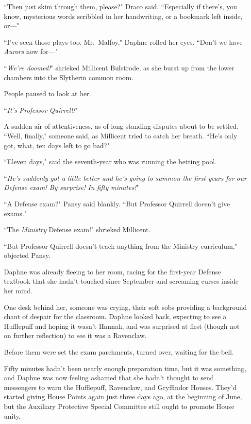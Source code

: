 ``Then just skim through them, please?" Draco said. ``Especially if there's, you know, mysterious words scribbled in her handwriting, or a bookmark left inside, or---"

``I've seen those plays too, Mr.~Malfoy." Daphne rolled her eyes. ``Don't we have \emph{Aurors} now for---"

``\emph{We're doomed!}" shrieked Millicent Bulstrode, as she burst up from the lower chambers into the Slytherin common room.

People paused to look at her.

``\emph{It's Professor Quirrell!}"

A sudden air of attentiveness, as of long-standing disputes about to be settled. ``Well, finally," someone said, as Millicent tried to catch her breath. ``He's only got, what, ten days left to go bad?"

``Eleven days," said the seventh-year who was running the betting pool.

``\emph{He's suddenly got a little better and he's going to summon the first-years for our Defense exam! By surprise! In fifty minutes!}"

``A Defense exam?" Pansy said blankly. ``But Professor Quirrell doesn't give exams."

``The \emph{Ministry} Defense exam!" shrieked Millicent.

``But Professor Quirrell doesn't teach anything from the Ministry curriculum," objected Pansy.

Daphne was already fleeing to her room, racing for the first-year Defense textbook that she hadn't touched since September and screaming curses inside her mind.

\later

One desk behind her, someone was crying, their soft sobs providing a background chant of despair for the classroom. Daphne looked back, expecting to see a Hufflepuff and hoping it wasn't Hannah, and was surprised at first (though not on further reflection) to see it was a Ravenclaw.

Before them were set the exam parchments, turned over, waiting for the bell.

Fifty minutes hadn't been nearly enough preparation time, but it was something, and Daphne was now feeling ashamed that she hadn't thought to send messengers to warn the Hufflepuff, Ravenclaw, and Gryffindor Houses. They'd started giving House Points again just three days ago, at the beginning of June, but the Auxiliary Protective Special Committee still ought to promote House unity.

